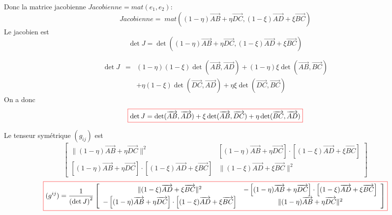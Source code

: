 \documentclass{beamer}
\newcommand{\myredbox}[1]{\fcolorbox{red}{white}{$\displaystyle#1$}}
\begin{document}
\begin{frame}		
		
Donc la matrice jacobienne $Jacobienne=mat(e_1,e_2)$:
\[Jacobienne=\;mat((1-\eta)\overrightarrow{AB}+\eta\overrightarrow{DC}, (1-\xi)\overrightarrow{AD}+\xi\overrightarrow{BC})\]
Le jacobien est
\[\det J=\det((1-\eta)\overrightarrow{AB}+\eta\overrightarrow{DC}, (1-\xi)\overrightarrow{AD}+\xi\overrightarrow{BC})\]

\[\begin{array}{lll}
\det J &= & (1-\eta)(1-\xi)\det(\overrightarrow{AB},\overrightarrow{AD})+(1-\eta)\xi\det(\overrightarrow{AB},\overrightarrow{BC})\\   
&  & +\eta (1-\xi)\det(\overrightarrow{DC},\overrightarrow{AD})+\eta \xi\det(\overrightarrow{DC},\overrightarrow{BC})
\end{array} \]
On a donc 
\[\myredbox{\det J=\det(\overrightarrow{AB},\overrightarrow{AD}) +\xi\det(\overrightarrow{AB},\overrightarrow{DC})+\eta \det(\overrightarrow{BC},\overrightarrow{AD})}\]

Le tenseur symétrique $(g_{ij})$ est
{\footnotesize
\[\left[\begin{array}{cc}
\|(1-\eta)\overrightarrow{AB}+\eta\overrightarrow{DC}\|^2   &\left[(1-\eta)\overrightarrow{AB}+\eta\overrightarrow{DC}\right]\cdot \left[(1-\xi)\overrightarrow{AD}+\xi\overrightarrow{BC}\right] \\
\left[(1-\eta)\overrightarrow{AB}+\eta\overrightarrow{DC}\right]\cdot \left[(1-\xi)\overrightarrow{AD}+\xi\overrightarrow{BC}\right] & \|(1-\xi)\overrightarrow{AD}+\xi\overrightarrow{BC}\|^2
\end{array}\right]\]
}
{\tiny
\[\myredbox{(g^{ij})=\frac{1}{\left(\det J\right)^2}\left[\begin{array}{cc}
\|(1-\xi)\overrightarrow{AD}+\xi\overrightarrow{BC}\|^2   &-\left[(1-\eta)\overrightarrow{AB}+\eta\overrightarrow{DC}\right]\cdot \left[(1-\xi)\overrightarrow{AD}+\xi\overrightarrow{BC}\right] \\
-\left[(1-\eta)\overrightarrow{AB}+\eta\overrightarrow{DC}\right]\cdot \left[(1-\xi)\overrightarrow{AD}+\xi\overrightarrow{BC}\right] & \|(1-\eta)\overrightarrow{AB}+\eta\overrightarrow{DC}\|^2 
\end{array}\right]}\]
}

\end{frame}
\end{document}
